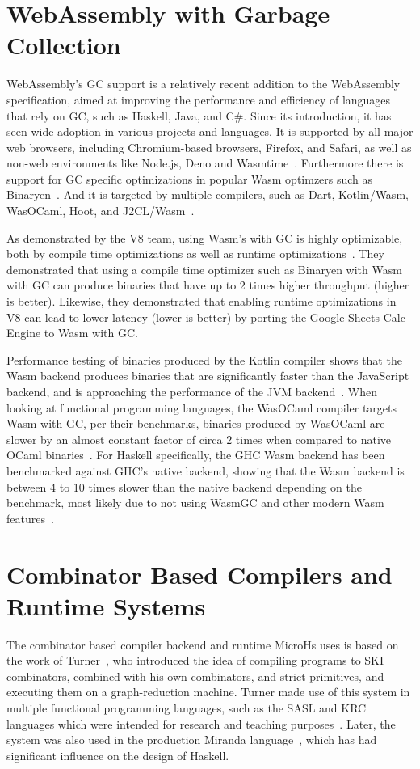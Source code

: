 \section{WebAssembly with Garbage Collection}
WebAssembly's GC support is a relatively recent addition to the WebAssembly specification, aimed at improving the performance and efficiency of languages that rely on GC, such as Haskell, Java, and C\#. Since its introduction, it has seen wide adoption in various projects and languages. It is supported by all major web browsers, including Chromium-based browsers, Firefox, and Safari, as well as non-web environments like Node.js, Deno and Wasmtime~\cite{wasm3}. Furthermore there is support for GC specific optimizations in popular Wasm optimzers such as Binaryen~\cite{wasm3,binaryen}. And it is targeted by multiple compilers, such as Dart, Kotlin/Wasm, WasOCaml, Hoot, and J2CL/Wasm~\cite{dart,kotlin,wasocaml,hoot,j2clwasm,wasmperf}.

As demonstrated by the V8 team, using Wasm's with GC is highly optimizable, both by compile time optimizations as well as runtime optimizations~\cite{v8blog}. They demonstrated that using a compile time optimizer such as Binaryen with Wasm with GC can produce binaries that have up to 2 times higher throughput (higher is better). Likewise, they demonstrated that enabling runtime optimizations in V8 can lead to lower latency (lower is better) by porting the Google Sheets Calc Engine to Wasm with GC.

Performance testing of binaries produced by the Kotlin compiler shows that the Wasm backend produces binaries that are significantly faster than the JavaScript backend, and is approaching the performance of the JVM backend~\cite{kotlin}. When looking at functional programming languages, the WasOCaml compiler targets Wasm with GC, per their benchmarks, binaries produced by WasOCaml are slower by an almost constant factor of circa 2 times when compared to native OCaml binaries~\cite{wasocaml}. For Haskell specifically, the GHC Wasm backend has been benchmarked against GHC's native backend, showing that the Wasm backend is between 4 to 10 times slower than the native backend depending on the benchmark, most likely due to not using WasmGC and other modern Wasm features~\cite{wasmperf}. 

\section{Combinator Based Compilers and Runtime Systems}
The combinator based compiler backend and runtime MicroHs uses is based on the work of Turner~\cite{turner}, who introduced the idea of compiling programs to SKI combinators, combined with his own combinators, and strict primitives, and executing them on a graph-reduction machine. Turner made use of this system in multiple functional programming languages, such as the SASL and KRC languages which were intended for research and teaching purposes~\cite{sasl,krc}. Later, the system was also used in the production Miranda language~\cite{miranda}, which has had significant influence on the design of Haskell.

